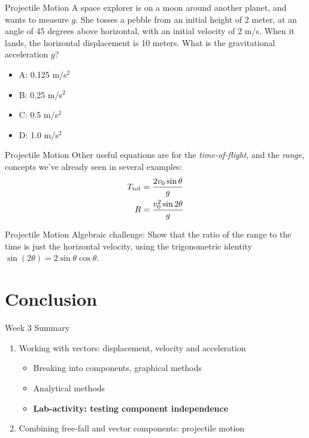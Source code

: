 \documentclass{beamer}
\begin{document}
\begin{frame}{Projectile Motion}
A space explorer is on a moon around another planet, and wants to measure $g$.  She tosses a pebble from an initial height of 2 meter, at an angle of 45 degrees above horizontal, with an initial velocity of 2 m/s.  When it lands, the horizontal displacement is 10 meters.  What is the gravitational acceleration $g$?
\begin{itemize}
\item A: 0.125 m/s$^2$
\item B: 0.25 m/s$^2$
\item C: 0.5 m/s$^2$
\item D: 1.0 m/s$^2$
\end{itemize}
\end{frame}

\begin{frame}{Projectile Motion}
Other useful equations are for the \textit{time-of-flight}, and the \textit{range}, concepts we've already seen in several examples: \\
\begin{align}
T_{\rm tof} &= \frac{2v_{\rm 0}\sin\theta}{g} \\
R &= \frac{v_{\rm 0}^2\sin2\theta}{g}
\end{align}
\end{frame}

\begin{frame}{Projectile Motion}
\alert{Algebraic challenge}: Show that the ratio of the range to the time is just the horizontal velocity, using the trigonometric identity $\sin(2\theta) = 2\sin\theta\cos\theta$.
\end{frame}

\section{Conclusion}

\begin{frame}{Week 3 Summary}
\begin{enumerate}
\item Working with vectors: displacement, velocity and acceleration
\begin{itemize}
\item Breaking into components, graphical methods
\item Analytical methods
\item \textbf{Lab-activity: testing component independence}
\end{itemize}
\item Combining free-fall and vector components: \alert{projectile motion}
\end{enumerate}
\end{frame}
\end{document}
